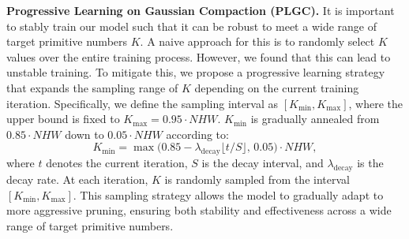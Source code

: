 \noindent \textbf{Progressive Learning on Gaussian Compaction (PLGC).} It is important to stably train our model such that it can be robust to meet a wide range of target primitive numbers $K$. A naive approach for this is to randomly select $K$ values over the entire training process. However, we found that this can lead to unstable training. To mitigate this, we propose a progressive learning strategy that expands the sampling range of $K$ depending on the current training iteration. Specifically, we define the sampling interval as $[K_{\text{min}}, K_{\text{max}}]$, where the upper bound is fixed to $K_{\text{max}} = 0.95 \cdot NHW$. $K_{\text{min}}$ is gradually annealed from $0.85 \cdot NHW$ down to $0.05 \cdot NHW$ according to:
\begin{equation}
    K_{\text{min}} = \max\big(0.85 - \lambda_\text{decay} \lfloor t / S \rfloor, \, 0.05\big) \cdot NHW,
\end{equation}
where $t$ denotes the current iteration, $S$ is the decay interval, and $\lambda_\text{decay}$ is the decay rate. At each iteration, $K$ is randomly sampled from the interval $[K_{\text{min}}, K_{\text{max}}]$. This sampling strategy allows the model to gradually adapt to more aggressive pruning, ensuring both stability and effectiveness across a wide range of target primitive numbers.







